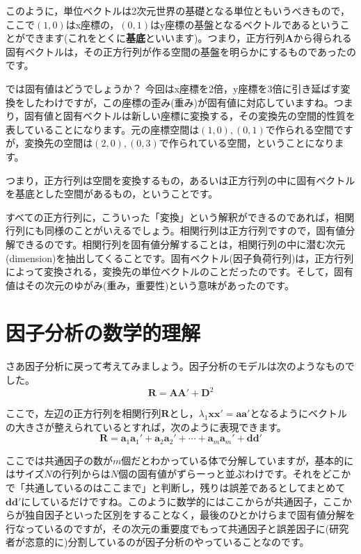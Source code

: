 \documentclass{ltjsbook}
\begin{document}
このように，単位ベクトルは2次元世界の基礎となる単位ともいうべきもので，ここで$(1,0)$はx座標の，$(0,1)$はy座標の基盤となるベクトルであるということができます(これをとくに\textbf{基底}といいます)。つまり，正方行列$\bm{A}$から得られる固有ベクトルは，その正方行列が作る空間の基盤を明らかにするものであったのです。

では固有値はどうでしょうか？ 今回はx座標を2倍，y座標を3倍に引き延ばす変換をしたわけですが，この座標の歪み(重み)が固有値に対応していますね。つまり，固有値と固有ベクトルは新しい座標に変換する，その変換先の空間的性質を表していることになります。元の座標空間は$(1,0),(0,1)$で作られる空間ですが，変換先の空間は$(2,0),(0,3)$で作られている空間，ということになります。

つまり，正方行列は空間を変換するもの，あるいは正方行列の中に固有ベクトルを基底とした空間があるもの，ということです。

すべての正方行列に，こういった「変換」という解釈ができるのであれば，相関行列にも同様のことがいえるでしょう。相関行列は正方行列ですので，固有値分解できるのです。相関行列を固有値分解することは，相関行列の中に潜む次元(dimension)を抽出してくることです。固有ベクトル(因子負荷行列)は，正方行列によって変換される，変換先の単位ベクトルのことだったのです。そして，固有値はその次元のゆがみ(重み，重要性)という意味があったのです。

\section{因子分析の数学的理解}
さあ因子分析に戻って考えてみましょう。因子分析のモデルは次のようなものでした。
\begin{equation}
    \bm{R} = \bm{A} \bm{A} ' + \bm{D}^2
\end{equation}

ここで，左辺の正方行列を相関行列$\bm{R}$とし，$\lambda_1 \bm{xx'} = \bm{aa'}$となるようにベクトルの大きさが整えられているとすれば，次のように表現できます。
\begin{equation}
    \bm{R}=\bm{a}_1\bm{a}_1'+\bm{a}_2\bm{a}_2'+\cdots +\bm{a}_m\bm{a}_m'+\bm{d} \bm{d}'
\end{equation}

ここでは共通因子の数が$m$個だとわかっている体で分解していますが，基本的にはサイズ$N$の行列からは$N$個の固有値がずらーっと並ぶわけです。それをどこかで「共通しているのはここまで」と判断し，残りは誤差であるとしてまとめて$\bm{dd'}$にしているだけですね。このように数学的にはここからが共通因子，ここからが独自因子といった区別をすることなく，最後のひとかけらまで固有値分解を行なっているのですが，その次元の重要度でもって共通因子と誤差因子に(研究者が恣意的に)分割しているのが因子分析のやっていることなのです。
\end{document}
